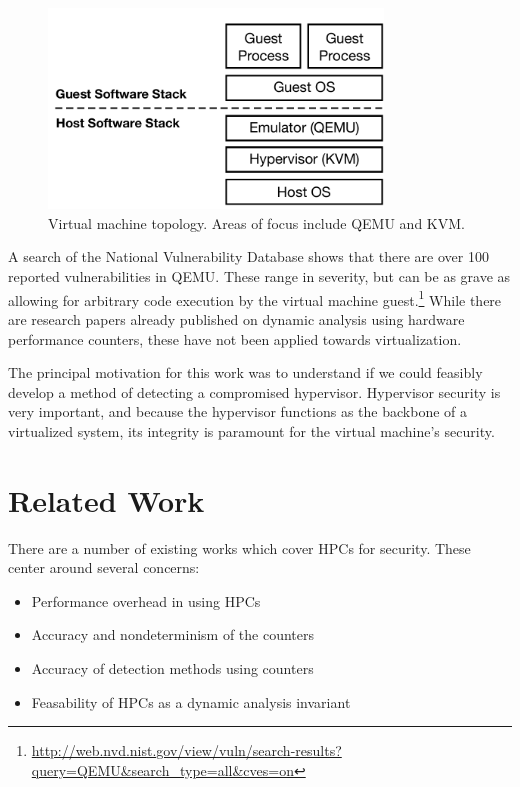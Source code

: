 \documentclass[notitlepage]{article}
\begin{document}
\begin{figure}[htp]
    \centering
    \includegraphics[width=3.5in]{topology.pdf}
    \caption{Virtual machine topology. Areas of focus include QEMU and KVM.}
    \label{fig:vmtop}
\end{figure}

A search of the National Vulnerability Database shows that there are over
100 reported vulnerabilities in QEMU. These range in severity, but can be as grave
as allowing for arbitrary code execution by the virtual machine
guest.\footnote{\url{http://web.nvd.nist.gov/view/vuln/search-results?query=QEMU&search_type=all&cves=on}}
While there are research papers already published on dynamic analysis using
hardware performance counters, these have not been applied towards
virtualization\cite{numchecker}\cite{feasibility}\cite{pc}.

The principal motivation for this work was to understand if we could feasibly
develop a method of detecting a compromised hypervisor. Hypervisor security is
very important, and because the hypervisor functions as the backbone of a
virtualized system, its integrity is paramount for the virtual machine's
security.


\section{Related Work}
\label{sec:related}
There are a number of existing works which cover HPCs for security. These center
around several concerns:
\begin{itemize}
    \item Performance overhead in using HPCs
    \item Accuracy and nondeterminism of the counters
    \item Accuracy of detection methods using counters
    \item Feasability of HPCs as a dynamic analysis invariant
\end{itemize}
\end{document}
